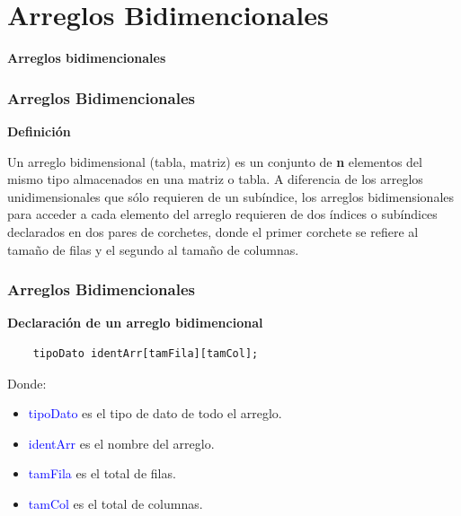 \section*{Arreglos Bidimencionales}

\begin{frame}[c] 
\centering
\huge \textbf{Arreglos bidimencionales}
\end{frame}

\begin{frame}
\frametitle{Arreglos Bidimencionales}
\begin{center}
    \textbf{Definición}
\end{center}
\justify
\hspace{5mm}Un arreglo bidimensional (tabla, matriz) es un conjunto de \textbf{n} elementos del mismo tipo almacenados en una matriz o tabla. A diferencia de los arreglos unidimensionales que sólo requieren de un subíndice, los arreglos bidimensionales para acceder a cada elemento del arreglo requieren de dos índices o subíndices declarados en dos pares de corchetes, donde el primer corchete se refiere al tamaño de filas y el segundo al tamaño de columnas.
\end{frame}


\begin{frame}[fragile]
    \frametitle{Arreglos Bidimencionales}
    \begin{center}
        \textbf{Declaración de un arreglo bidimencional}
    \end{center}
    \begin{lstlisting}
    tipoDato identArr[tamFila][tamCol];
    \end{lstlisting}
    Donde:
    \begin{itemize}
        \item \textcolor{blue}{tipoDato} es el tipo de dato de todo el arreglo.\pause
        \item \textcolor{blue}{identArr} es el nombre del arreglo.\pause
        \item \textcolor{blue}{tamFila} es el total de filas.\pause
        \item \textcolor{blue}{tamCol} es el total de columnas.
    \end{itemize}
\end{frame}


